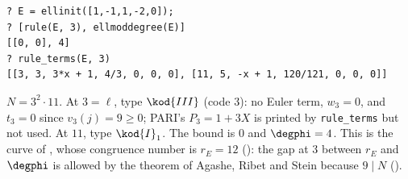 \begin{sloppypar}
\begin{example}[\curve{99a1}]\label{ex:computation:99a1}
\begin{lstlisting}[language=GP]
? E = ellinit([1,-1,1,-2,0]);
? [rule(E, 3), ellmoddegree(E)]
[[0, 0], 4]
? rule_terms(E, 3)
[[3, 3, 3*x + 1, 4/3, 0, 0, 0], [11, 5, -x + 1, 120/121, 0, 0, 0]]
\end{lstlisting}
$N=3^2\cdot11$. At $3=\ell$, type $\kod{III}$ (code $3$): no Euler term, $w_3=0$, and $t_3=0$ since $v_3(j)=9\ge0$; PARI's $P_3=1+3X$ is printed by
\texttt{rule\_terms} but not used. At $11$, type $\kod{I}_1$. The bound is $0$ and $\degphi=4$. This is the curve  of \cite{ARS12}, whose congruence number is
$r_E=12$ (): the gap at $3$ between $r_E$ and $\degphi$ is allowed by the theorem of Agashe, Ribet and Stein because $9\mid N$
().
\end{example}


\end{sloppypar}
